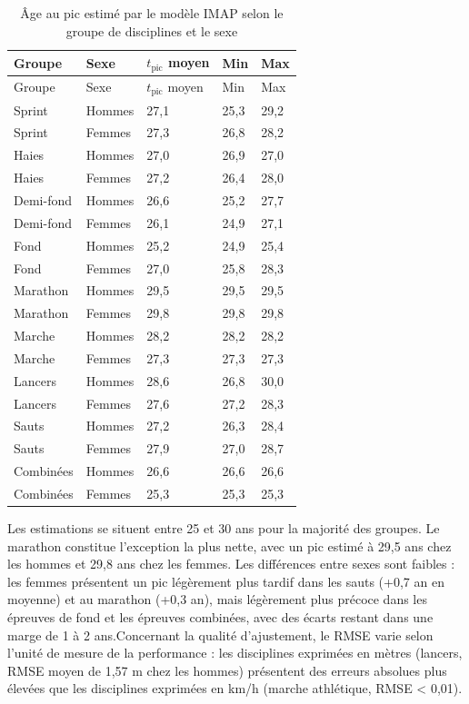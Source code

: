 \documentclass[
  french,
  11pt,
  a4paper,
]{article}
\begin{document}
\begin{longtable}[]{@{}lllll@{}}
\caption{Âge au pic estimé par le modèle IMAP selon le groupe de
disciplines et le sexe}\label{tbl-imap-groupes}\tabularnewline
\toprule\noalign{}
Groupe & Sexe & \(t_{\text{pic}}\) moyen & Min & Max \\
\midrule\noalign{}
\endfirsthead
\toprule\noalign{}
Groupe & Sexe & \(t_{\text{pic}}\) moyen & Min & Max \\
\midrule\noalign{}
\endhead
\bottomrule\noalign{}
\endlastfoot
Sprint & Hommes & 27,1 & 25,3 & 29,2 \\
Sprint & Femmes & 27,3 & 26,8 & 28,2 \\
Haies & Hommes & 27,0 & 26,9 & 27,0 \\
Haies & Femmes & 27,2 & 26,4 & 28,0 \\
Demi-fond & Hommes & 26,6 & 25,2 & 27,7 \\
Demi-fond & Femmes & 26,1 & 24,9 & 27,1 \\
Fond & Hommes & 25,2 & 24,9 & 25,4 \\
Fond & Femmes & 27,0 & 25,8 & 28,3 \\
Marathon & Hommes & 29,5 & 29,5 & 29,5 \\
Marathon & Femmes & 29,8 & 29,8 & 29,8 \\
Marche & Hommes & 28,2 & 28,2 & 28,2 \\
Marche & Femmes & 27,3 & 27,3 & 27,3 \\
Lancers & Hommes & 28,6 & 26,8 & 30,0 \\
Lancers & Femmes & 27,6 & 27,2 & 28,3 \\
Sauts & Hommes & 27,2 & 26,3 & 28,4 \\
Sauts & Femmes & 27,9 & 27,0 & 28,7 \\
Combinées & Hommes & 26,6 & 26,6 & 26,6 \\
Combinées & Femmes & 25,3 & 25,3 & 25,3 \\
\end{longtable}

Les estimations se situent entre 25 et 30 ans pour la majorité des
groupes. Le marathon constitue l'exception la plus nette, avec un pic
estimé à 29,5 ans chez les hommes et 29,8 ans chez les femmes. Les
différences entre sexes sont faibles : les femmes présentent un pic
légèrement plus tardif dans les sauts (+0,7 an en moyenne) et au
marathon (+0,3 an), mais légèrement plus précoce dans les épreuves de
fond et les épreuves combinées, avec des écarts restant dans une marge
de 1 à 2 ans.Concernant la qualité d'ajustement, le RMSE varie selon
l'unité de mesure de la performance : les disciplines exprimées en
mètres (lancers, RMSE moyen de 1,57 m chez les hommes) présentent des
erreurs absolues plus élevées que les disciplines exprimées en km/h
(marche athlétique, RMSE \textless{} 0,01).
\end{document}

